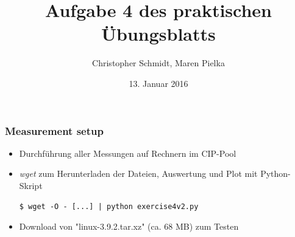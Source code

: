 \documentclass[handout]{beamer}
\title[Aufgabe 4]{Aufgabe 4 des praktischen Übungsblatts}
\author[Schmidt, Pielka]{Christopher Schmidt, Maren Pielka}
\institute[Uni Bonn]{Universität Bonn}
\date[13.01.16]{13. Januar 2016}
\begin{document}
\begin{frame}
\titlepage
\end{frame}

\begin{frame}[containsverbatim]
\frametitle{Measurement setup}
\begin{itemize}
\item Durchführung aller Messungen auf Rechnern im CIP-Pool
\item \textit{wget} zum Herunterladen der Dateien, Auswertung und Plot mit Python-Skript
\lstset{language=sh,basicstyle=\footnotesize}
\begin{lstlisting}
$ wget -O - [...] | python exercise4v2.py
\end{lstlisting}
\item Download von "linux-3.9.2.tar.xz" (ca. 68 MB) zum Testen 
\end{itemize}
\end{frame}
\end{document}
